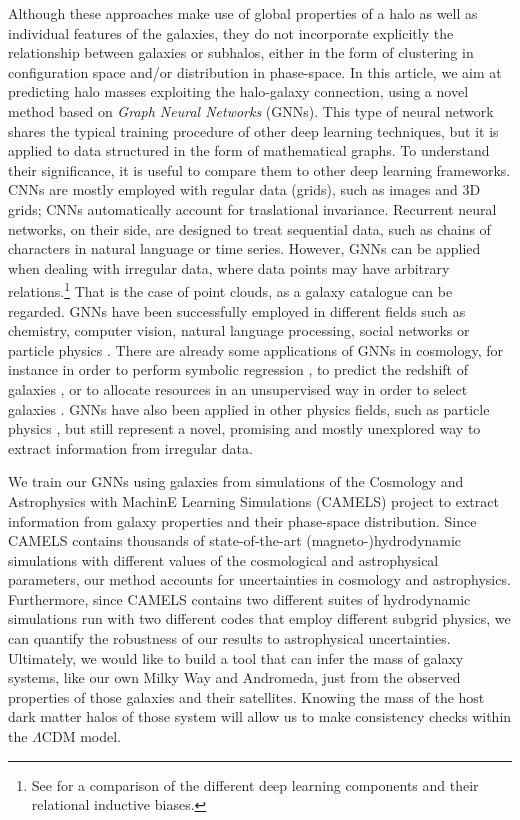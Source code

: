\documentclass[twocolumn]{aastex631}
\begin{document}
Although these approaches make use of global properties of a halo as well as individual features of the galaxies, they do not incorporate explicitly the relationship between galaxies or subhalos, either in the form of clustering in configuration space and/or distribution in phase-space. In this article, we aim at predicting halo masses exploiting the halo-galaxy connection, using a novel method based on \textit{Graph Neural Networks} (GNNs). This type of neural network shares the typical training procedure of other deep learning techniques, but it is applied to data structured in the form of mathematical graphs. To understand their significance, it is useful to compare them to other deep learning frameworks. CNNs are mostly employed with regular data (grids), such as images and 3D grids; CNNs automatically account for traslational invariance. Recurrent neural networks, on their side, are designed to treat sequential data, such as chains of characters in natural language or time series. However, GNNs can be applied when dealing with irregular data, where data points may have arbitrary relations.\footnote{See \cite{2018arXiv180601261B} for a comparison of the different deep learning components and their relational inductive biases.} That is the case of point clouds, as a galaxy catalogue can be regarded. GNNs have been successfully employed in different fields such as chemistry, computer vision, natural language processing, social networks or particle physics \citep{2019arXiv190100596W, 2021arXiv210413478B}. There are already some applications of GNNs in cosmology, for instance in order to perform symbolic regression \citep{2019arXiv190905862C, Cranmer:2020wew}, to predict the redshift of galaxies \citep{Beck2019RefinedRR}, or to allocate resources in an unsupervised way in order to select galaxies \citep{Cranmer:2021pve}. GNNs have also been applied in other physics fields, such as particle physics \citep{Shlomi:2020gdn}, but still represent a novel, promising and mostly unexplored way to extract information from irregular data.

We train our GNNs using galaxies from simulations of the Cosmology and Astrophysics with MachinE Learning Simulations (CAMELS) project \citep{villaescusanavarro2020camels} to extract information from galaxy properties and their phase-space distribution. Since CAMELS contains thousands of state-of-the-art (magneto-)hydrodynamic simulations with different values of the cosmological and astrophysical parameters, our method accounts for uncertainties in cosmology and astrophysics. Furthermore, since CAMELS contains two different suites of hydrodynamic simulations run with two different codes that employ different subgrid physics, we can quantify the robustness of our results to astrophysical uncertainties. Ultimately, we would like to build a tool that can infer the mass of galaxy systems, like our own Milky Way and Andromeda, just from the observed properties of those galaxies and their satellites. Knowing the mass of the host dark matter halos of those system will allow us to make consistency checks within the $\Lambda$CDM model.
\end{document}
